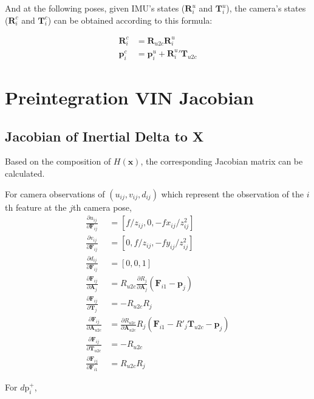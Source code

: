 \documentclass[12pt]{article}   %
\begin{document}
\begin{appendices}
And at the following poses, given IMU's states ($\textbf{R}^u_i$ and
$\textbf{T}^u_i$), the camera's states ($\textbf{R}^c_i$ and $\textbf{T}^c_i$)
can be obtained according to this formula:

\begin{align*}
\textbf{R}^c_i &= \textbf{R}_{u2c} \textbf{R}^u_i \\
\textbf{p}^c_i &= \textbf{p}^u_i + {\textbf{R}^u_i}'  \textbf{T}_{u2c}  
\end{align*} 
	
\section{Preintegration VIN Jacobian}
\label{apn:preintVin}
\subsection{Jacobian of Inertial Delta to X}
Based on the composition of $H(\textbf{x})$, the corresponding Jacobian matrix
can be calculated. 

For camera observations of $(u_{ij}, v_{ij}, d_{ij})$ which represent the
observation of the $i$th feature at the $j$th camera pose, 
\begin{align}
\frac{\partial u_{ij}}{\partial \textbf{F}_{ij}} &= [f/z_{ij}, 0, -fx_{ij}/z^2_{ij}] \\
\frac{\partial v_{ij}}{\partial \textbf{F}_{ij}} &= [0, f/z_{ij}, -fy_{ij}/z^2_{ij}] \\
\frac{\partial d_{ij}}{\partial \textbf{F}_{ij}} &= [0, 0, 1] \\
\frac{\partial \textbf{F}_{ij}}{\partial \textbf{A}_{j}} &= R_{u2c} \frac{\partial R_{j}}{\partial \textbf{A}_{j}} (\textbf{F}_{i1} - \textbf{p}_{j}) \\
\frac{\partial \textbf{F}_{ij}}{\partial \textbf{T}_{j}} &= -R_{u2c} R_{j} \\
\frac{\partial \textbf{F}_{ij}}{\partial \textbf{A}_{u2c}} &= \frac{\partial R_{u2c}}{\partial \textbf{A}_{u2c}} R_{j}(\textbf{F}_{i1} - R'_{j} \textbf{T}_{u2c} - \textbf{p}_{j}) \\
\frac{\partial \textbf{F}_{ij}}{\partial \textbf{T}_{u2c}} &= -R_{u2c}\\
\frac{\partial \textbf{F}_{ij}}{\partial \textbf{F}_{i1}} &= R_{u2c} R_{j} 
\end{align}

For $d\text{p}^+_{i}$,


\end{appendices}
\end{document}
